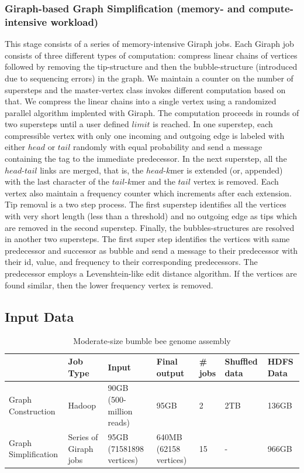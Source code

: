 \documentclass[conference]{IEEEtran}
\begin{document}
\subsubsection {Giraph-based Graph Simplification (memory- and compute-intensive workload)}
This stage consists of a series of memory-intensive Giraph jobs. Each Giraph job consists of three different types of computation: compress linear chains of vertices followed by removing the tip-structure and then the bubble-structure (introduced due to sequencing errors) in the graph. We maintain a counter on the number of supersteps and the master-vertex class invokes different computation based on that. We compress the linear chains into a single vertex using a randomized parallel algorithm implented with Giraph. The computation proceeds in rounds of two supersteps until a user defined $limit$ is reached. In one superstep, each compressible vertex with only one incoming and outgoing edge is labeled with either $head$ or $tail$ randomly with equal probability and send a message containing the tag to the immediate predecessor. In the next superstep, all the $head$-$tail$ links are merged, that is, the $head$-$k$mer is extended (or, appended) with the last character of the $tail$-$k$mer and the $tail$ vertex is removed. Each vertex also maintain a frequency counter which increments after each extension. Tip removal is a two step process. The first superstep identifies all the vertices with very short length (less than a threshold) and no outgoing edge as tips which are removed in the second superstep. Finally, the bubbles-structures are resolved in another two supersteps. The first super step identifies the vertices with same predecessor and successor as bubble and send a message to their predecessor with their id, value, and frequency to their corresponding predecessors. The predecessor employs a Levenshtein-like edit distance algorithm. If the vertices are found similar, then the lower frequency vertex is removed. 

\subsection {Input Data} \label{InputData}
\begin{table}
\begin{center}
    \begin{tabular}{ |p{1cm} | p{0.7cm} | p{1cm} | p{0.7cm} | p{0.7cm} | p{0.7cm} | p{0.7cm}|} \hline
    & Job Type & Input & Final output & \# jobs & Shuffled data & HDFS Data \\ \hline
    Graph Construction & Hadoop & 90GB (500-million reads) & 95GB & 2 & 2TB & 136GB \\ \hline
    Graph Simplification & Series of Giraph jobs & 95GB (71581898 vertices) & 640MB (62158 vertices) & 15 & - & 966GB \\ \hline    
    \end{tabular}
    \caption{Moderate-size bumble bee genome assembly}
	\label{table:BumbleBeeData}
\end{center}
\end{table}
\end{document}
